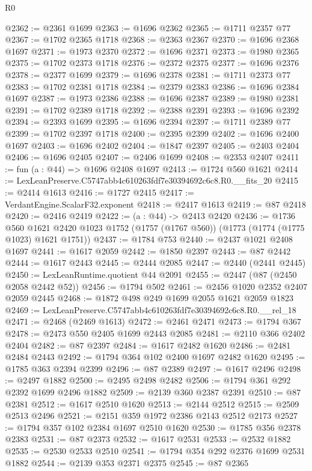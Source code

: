 \begin{lexlean}{R0}
\begin{coremodule}
@2362 := @2361 @1699
@2363 := @1696 @2362
@2365 := @1711 @2357 @77
@2367 := @1702 @2365 @1718
@2368 := @2363 @2367
@2370 := @1696 @2368 @1697
@2371 := @1973 @2370
@2372 := @1696 @2371
@2373 := @1980 @2365
@2375 := @1702 @2373 @1718
@2376 := @2372 @2375
@2377 := @1696 @2376
@2378 := @2377 @1699
@2379 := @1696 @2378
@2381 := @1711 @2373 @77
@2383 := @1702 @2381 @1718
@2384 := @2379 @2383
@2386 := @1696 @2384 @1697
@2387 := @1973 @2386
@2388 := @1696 @2387
@2389 := @1980 @2381
@2391 := @1702 @2389 @1718
@2392 := @2388 @2391
@2393 := @1696 @2392
@2394 := @2393 @1699
@2395 := @1696 @2394
@2397 := @1711 @2389 @77
@2399 := @1702 @2397 @1718
@2400 := @2395 @2399
@2402 := @1696 @2400 @1697
@2403 := @1696 @2402
@2404 := @1847 @2397
@2405 := @2403 @2404
@2406 := @1696 @2405
@2407 := @2406 @1699
@2408 := @2353 @2407
@2411 := fun (a : @44) => @1696 @2408 @1697
@2413 := @1724 @560 @1621
@2414 := LexLeanPreserve.C5747abb4c610263fdf7e30394692c6c8.R0.__fits_20
@2415 := @2414 @1613
@2416 := @1727 @2415
@2417 := VerdantEngine.ScalarF32.exponent
@2418 := @2417 @1613
@2419 := @87 @2418
@2420 := @2416 @2419
@2422 := (a : @44) -> @2413 @2420
@2436 := @1736
    @560
    @1621
    @2420
    @1023
    @1752
    (@1757 (@1767 @560))
    (@1773 (@1774 (@1775 @1023) @1621 @1751))
@2437 := @1784 @753
@2440 := @2437 @1021 @2408 @1697
@2441 := @1617 @2059
@2442 := @1850 @2397
@2443 := @87 @2442
@2444 := @1617 @2443
@2445 := @2444 @2085
@2447 := @2440 (@2441 @2445)
@2450 := LexLeanRuntime.quotient @44 @2091
@2455 := @2447 (@87 (@2450 @2058 @2442 @52))
@2456 := @1794 @502
@2461 := @2456 @1020 @2352 @2407 @2059 @2445
@2468 := @1872 @498 @249 @1699 @2055 @1621 @2059 @1823
@2469 := LexLeanPreserve.C5747abb4c610263fdf7e30394692c6c8.R0.__rel_18
@2471 := @2468 (@2469 @1613)
@2472 := @2461 @2471
@2473 := @1794 @367
@2478 := @2473 @550 @2405 @1699 @2443 @2085
@2481 := @2110 @366 @2402 @2404
@2482 := @87 @2397
@2484 := @1617 @2482 @1620
@2486 := @2481 @2484 @2443
@2492 := @1794 @364 @102 @2400 @1697 @2482 @1620
@2495 := @1785 @363 @2394 @2399
@2496 := @87 @2389
@2497 := @1617 @2496
@2498 := @2497 @1882
@2500 := @2495 @2498 @2482
@2506 := @1794 @361 @292 @2392 @1699 @2496 @1882
@2509 := @2139 @360 @2387 @2391
@2510 := @87 @2381
@2512 := @1617 @2510 @1620
@2513 := @2144 @2512
@2515 := @2509 @2513 @2496
@2521 := @2151 @359 @1972 @2386 @2143 @2512 @2173
@2527 := @1794 @357 @102 @2384 @1697 @2510 @1620
@2530 := @1785 @356 @2378 @2383
@2531 := @87 @2373
@2532 := @1617 @2531
@2533 := @2532 @1882
@2535 := @2530 @2533 @2510
@2541 := @1794 @354 @292 @2376 @1699 @2531 @1882
@2544 := @2139 @353 @2371 @2375
@2545 := @87 @2365

\end{coremodule}
\end{lexlean}

